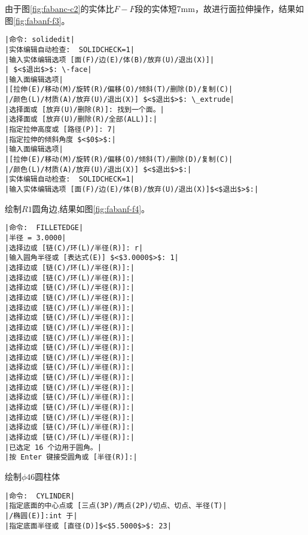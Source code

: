 \begin{procedure}
由于图\ref{fig:fabanc-c2}的实体比$F-F$段的实体短7mm，故进行面拉伸操作，结果如图\ref{fig:fabanf-f3}。
\begin{lstlisting}
|命令: solidedit|
|实体编辑自动检查:  SOLIDCHECK=1|
|输入实体编辑选项 [面(F)/边(E)/体(B)/放弃(U)/退出(X)]|
| $<$退出$>$: \-face|
|输入面编辑选项|
|[拉伸(E)/移动(M)/旋转(R)/偏移(O)/倾斜(T)/删除(D)/复制(C)|
|/颜色(L)/材质(A)/放弃(U)/退出(X)] $<$退出$>$: \_extrude|
|选择面或 [放弃(U)/删除(R)]: 找到一个面。|
|选择面或 [放弃(U)/删除(R)/全部(ALL)]:|
|指定拉伸高度或 [路径(P)]: 7|
|指定拉伸的倾斜角度 $<$0$>$:|
|输入面编辑选项|
|[拉伸(E)/移动(M)/旋转(R)/偏移(O)/倾斜(T)/删除(D)/复制(C)|
|/颜色(L)/材质(A)/放弃(U)/退出(X)] $<$退出$>$:|
|实体编辑自动检查:  SOLIDCHECK=1|
|输入实体编辑选项 [面(F)/边(E)/体(B)/放弃(U)/退出(X)]$<$退出$>$:|
\end{lstlisting}
\item 绘制$R1$圆角边,结果如图\ref{fig:fabanf-f4}。
\begin{lstlisting}
|命令:  FILLETEDGE|
|半径 = 3.0000|
|选择边或 [链(C)/环(L)/半径(R)]: r|
|输入圆角半径或 [表达式(E)] $<$3.0000$>$: 1|
|选择边或 [链(C)/环(L)/半径(R)]:|
|选择边或 [链(C)/环(L)/半径(R)]:|
|选择边或 [链(C)/环(L)/半径(R)]:|
|选择边或 [链(C)/环(L)/半径(R)]:|
|选择边或 [链(C)/环(L)/半径(R)]:|
|选择边或 [链(C)/环(L)/半径(R)]:|
|选择边或 [链(C)/环(L)/半径(R)]:|
|选择边或 [链(C)/环(L)/半径(R)]:|
|选择边或 [链(C)/环(L)/半径(R)]:|
|选择边或 [链(C)/环(L)/半径(R)]:|
|选择边或 [链(C)/环(L)/半径(R)]:|
|选择边或 [链(C)/环(L)/半径(R)]:|
|选择边或 [链(C)/环(L)/半径(R)]:|
|选择边或 [链(C)/环(L)/半径(R)]:|
|选择边或 [链(C)/环(L)/半径(R)]:|
|选择边或 [链(C)/环(L)/半径(R)]:|
|选择边或 [链(C)/环(L)/半径(R)]:|
|选择边或 [链(C)/环(L)/半径(R)]:|
|已选定 16 个边用于圆角。|
|按 Enter 键接受圆角或 [半径(R)]:|
\end{lstlisting}
\begin{figure}[htbp]
\centering
\begin{floatrow}[3]
\end{floatrow}
\end{figure}
\item 绘制$\phi 46$圆柱体
\begin{lstlisting}
|命令:  CYLINDER|
|指定底面的中心点或 [三点(3P)/两点(2P)/切点、切点、半径(T)|
|/椭圆(E)]:int 于|
|指定底面半径或 [直径(D)]$<$5.5000$>$: 23|

\end{lstlisting}
\end{procedure}
